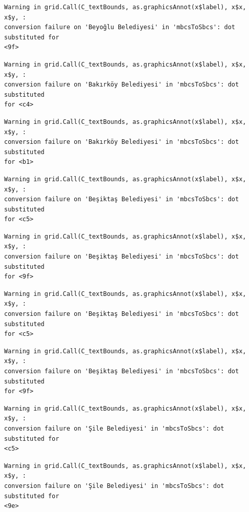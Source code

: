 \documentclass[
  11pt,
  a4paper,
  DIV=11,
  numbers=noendperiod]{scrartcl}
\begin{document}
\begin{verbatim}
Warning in grid.Call(C_textBounds, as.graphicsAnnot(x$label), x$x, x$y, :
conversion failure on 'Beyoğlu Belediyesi' in 'mbcsToSbcs': dot substituted for
<9f>
\end{verbatim}

\begin{verbatim}
Warning in grid.Call(C_textBounds, as.graphicsAnnot(x$label), x$x, x$y, :
conversion failure on 'Bakırköy Belediyesi' in 'mbcsToSbcs': dot substituted
for <c4>
\end{verbatim}

\begin{verbatim}
Warning in grid.Call(C_textBounds, as.graphicsAnnot(x$label), x$x, x$y, :
conversion failure on 'Bakırköy Belediyesi' in 'mbcsToSbcs': dot substituted
for <b1>
\end{verbatim}

\begin{verbatim}
Warning in grid.Call(C_textBounds, as.graphicsAnnot(x$label), x$x, x$y, :
conversion failure on 'Beşiktaş Belediyesi' in 'mbcsToSbcs': dot substituted
for <c5>
\end{verbatim}

\begin{verbatim}
Warning in grid.Call(C_textBounds, as.graphicsAnnot(x$label), x$x, x$y, :
conversion failure on 'Beşiktaş Belediyesi' in 'mbcsToSbcs': dot substituted
for <9f>
\end{verbatim}

\begin{verbatim}
Warning in grid.Call(C_textBounds, as.graphicsAnnot(x$label), x$x, x$y, :
conversion failure on 'Beşiktaş Belediyesi' in 'mbcsToSbcs': dot substituted
for <c5>
\end{verbatim}

\begin{verbatim}
Warning in grid.Call(C_textBounds, as.graphicsAnnot(x$label), x$x, x$y, :
conversion failure on 'Beşiktaş Belediyesi' in 'mbcsToSbcs': dot substituted
for <9f>
\end{verbatim}

\begin{verbatim}
Warning in grid.Call(C_textBounds, as.graphicsAnnot(x$label), x$x, x$y, :
conversion failure on 'Şile Belediyesi' in 'mbcsToSbcs': dot substituted for
<c5>
\end{verbatim}

\begin{verbatim}
Warning in grid.Call(C_textBounds, as.graphicsAnnot(x$label), x$x, x$y, :
conversion failure on 'Şile Belediyesi' in 'mbcsToSbcs': dot substituted for
<9e>
\end{verbatim}
\end{document}
